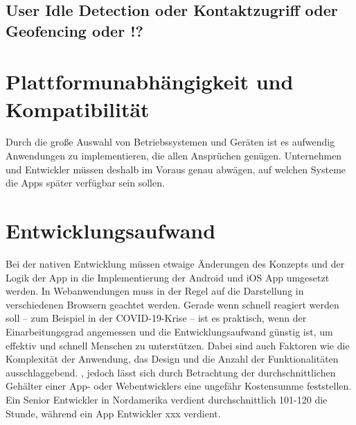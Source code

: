 \subsection{User Idle Detection oder Kontaktzugriff oder Geofencing oder !?}


\section{Plattformunabhängigkeit und Kompatibilität}
Durch die große Auswahl von Betriebssystemen und Geräten ist es aufwendig Anwendungen zu implementieren, die allen Ansprüchen genügen. Unternehmen und Entwickler müssen deshalb im Voraus genau abwägen, auf welchen Systeme die Apps später verfügbar sein sollen. 

\section{Entwicklungsaufwand}
Bei der nativen Entwicklung müssen etwaige Änderungen des Konzepts und der Logik der App in die Implementierung der Android und iOS App umgesetzt werden. In Webanwendungen muss in der Regel auf die Darstellung in verschiedenen Browsern geachtet werden.
Gerade wenn schnell reagiert werden soll -- zum Beispiel in der COVID-19-Krise -- ist es praktisch, wenn der Einarbeitungsgrad angemessen und die Entwicklungsaufwand günstig ist, um effektiv und schnell Menschen zu unterstützen. Dabei sind auch Faktoren wie die Komplexität der Anwendung, das Design und die Anzahl der Funktionalitäten ausschlaggebend.
, jedoch lässt sich durch Betrachtung der durchschnittlichen Gehälter einer App- oder Webentwicklers eine ungefähr Kostensumme feststellen. Ein Senior Entwickler in Nordamerika verdient durchschnittlich 101-120 die Stunde, während ein App Entwickler xxx verdient.
